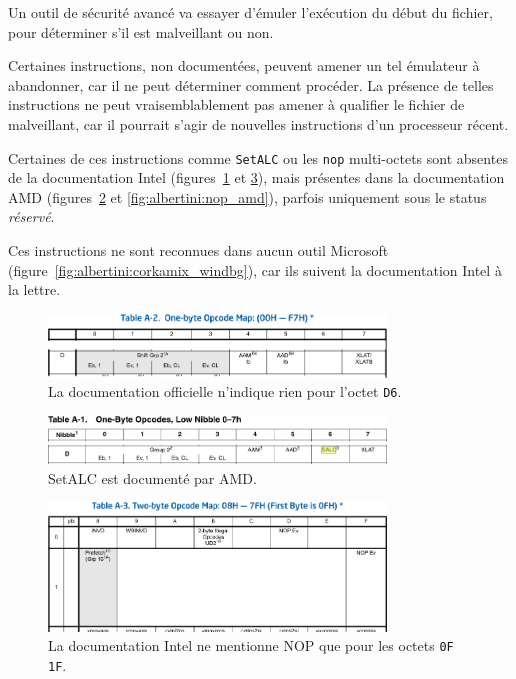 Un outil de sécurité avancé va essayer d'émuler l'exécution du début du fichier, pour déterminer s'il est malveillant ou non.

Certaines instructions, non documentées, peuvent amener un tel émulateur à abandonner, car il ne peut déterminer comment procéder. La présence de telles instructions ne peut vraisemblablement pas amener à qualifier le fichier de malveillant, car il pourrait s'agir de nouvelles instructions d'un processeur récent.

Certaines de ces instructions comme {\tt SetALC} ou les {\tt nop} multi-octets sont absentes de la documentation Intel (figures~\ref{fig:albertini:undoc_setalc} et \ref{fig:albertini:undoc_nop}), mais présentes dans la documentation AMD (figures~\ref{fig:albertini:salc_amd} et \ref{fig:albertini:nop_amd}), parfois uniquement sous le status \emph{réservé}.


Ces instructions ne sont reconnues dans aucun outil Microsoft (figure~\ref{fig:albertini:corkamix_windbg}), car ils suivent la documentation Intel à la lettre.


\begin{figure}[ht]
  \centering
  \includegraphics[width=0.8\textwidth]{albertini/img/undoc_setalc}
  \caption{La documentation officielle n'indique rien pour l'octet \texttt{D6}.}
  \label{fig:albertini:undoc_setalc}
\end{figure}

\begin{figure}[ht]
  \centering
  \includegraphics[width=0.8\textwidth]{albertini/img/salc_amd}
  \caption{SetALC est documenté par AMD.}
  \label{fig:albertini:salc_amd}
\end{figure}

\begin{figure}[ht]
  \centering
  \includegraphics[width=0.8\textwidth]{albertini/img/undoc_nop}
  \caption{La documentation Intel ne mentionne NOP que pour les octets \texttt{0F 1F}.}
  \label{fig:albertini:undoc_nop}
\end{figure}

